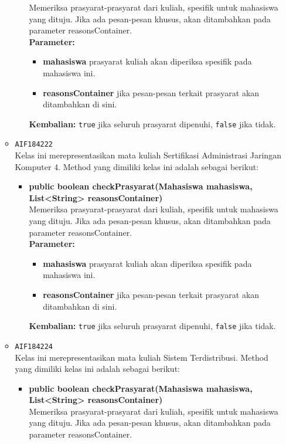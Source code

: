 \begin{enumerate}
\begin{itemize}
\begin{itemize}
Memeriksa prasyarat-prasyarat dari kuliah, spesifik untuk mahasiswa yang dituju. Jika ada pesan-pesan khusus, akan ditambahkan pada parameter reasonsContainer.\\
\textbf{Parameter:}
\begin{itemize}
\item \textbf{mahasiswa} prasyarat kuliah akan diperiksa spesifik pada mahasiswa ini.
\item \textbf{reasonsContainer} jika pesan-pesan terkait prasyarat akan ditambahkan di sini.
\end{itemize}
\textbf{Kembalian:} \texttt{true} jika seluruh prasyarat dipenuhi, \texttt{false} jika tidak.
\end{itemize}
\item \texttt{AIF184222} \\
Kelas ini merepresentasikan mata kuliah Sertifikasi Administrasi Jaringan Komputer 4. Method yang dimiliki kelas ini adalah sebagai berikut: 
\begin{itemize}
\item \textbf{public boolean checkPrasyarat(Mahasiswa mahasiswa, List<String> reasonsContainer)}\\
Memeriksa prasyarat-prasyarat dari kuliah, spesifik untuk mahasiswa yang dituju. Jika ada pesan-pesan khusus, akan ditambahkan pada parameter reasonsContainer.\\
\textbf{Parameter:}
\begin{itemize}
\item \textbf{mahasiswa} prasyarat kuliah akan diperiksa spesifik pada mahasiswa ini.
\item \textbf{reasonsContainer} jika pesan-pesan terkait prasyarat akan ditambahkan di sini.
\end{itemize}
\textbf{Kembalian:} \texttt{true} jika seluruh prasyarat dipenuhi, \texttt{false} jika tidak.
\end{itemize}
\item \texttt{AIF184224} \\
Kelas ini merepresentasikan mata kuliah Sistem Terdistribusi. Method yang dimiliki kelas ini adalah sebagai berikut: 
\begin{itemize}
\item \textbf{public boolean checkPrasyarat(Mahasiswa mahasiswa, List<String> reasonsContainer)}\\
Memeriksa prasyarat-prasyarat dari kuliah, spesifik untuk mahasiswa yang dituju. Jika ada pesan-pesan khusus, akan ditambahkan pada parameter reasonsContainer.\\

\end{itemize}
\end{itemize}
\end{enumerate}
